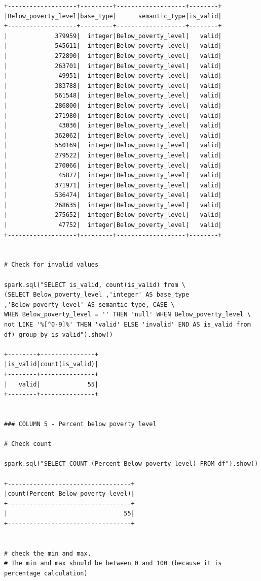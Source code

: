 \documentclass{article}
\begin{document}
\begin{verbatim}
+-------------------+---------+-------------------+--------+
|Below_poverty_level|base_type|      semantic_type|is_valid|
+-------------------+---------+-------------------+--------+
|             379959|  integer|Below_poverty_level|   valid|
|             545611|  integer|Below_poverty_level|   valid|
|             272890|  integer|Below_poverty_level|   valid|
|             263701|  integer|Below_poverty_level|   valid|
|              49951|  integer|Below_poverty_level|   valid|
|             383788|  integer|Below_poverty_level|   valid|
|             561548|  integer|Below_poverty_level|   valid|
|             286800|  integer|Below_poverty_level|   valid|
|             271980|  integer|Below_poverty_level|   valid|
|              43036|  integer|Below_poverty_level|   valid|
|             362062|  integer|Below_poverty_level|   valid|
|             550169|  integer|Below_poverty_level|   valid|
|             279522|  integer|Below_poverty_level|   valid|
|             270066|  integer|Below_poverty_level|   valid|
|              45877|  integer|Below_poverty_level|   valid|
|             371971|  integer|Below_poverty_level|   valid|
|             536474|  integer|Below_poverty_level|   valid|
|             268635|  integer|Below_poverty_level|   valid|
|             275652|  integer|Below_poverty_level|   valid|
|              47752|  integer|Below_poverty_level|   valid|
+-------------------+---------+-------------------+--------+


# Check for invalid values

spark.sql("SELECT is_valid, count(is_valid) from \  
(SELECT Below_poverty_level ,'integer' AS base_type ,'Below_poverty_level' AS semantic_type, CASE \  
WHEN Below_poverty_level = '' THEN 'null' WHEN Below_poverty_level \  
not LIKE '%[^0-9]%' THEN 'valid' ELSE 'invalid' END AS is_valid from df) group by is_valid").show()

+--------+---------------+
|is_valid|count(is_valid)|
+--------+---------------+
|   valid|             55|
+--------+---------------+


### COLUMN 5 - Percent below poverty level

# Check count

spark.sql("SELECT COUNT (Percent_Below_poverty_level) FROM df").show()

+----------------------------------+
|count(Percent_Below_poverty_level)|
+----------------------------------+
|                                55|
+----------------------------------+


# check the min and max. 
# The min and max should be between 0 and 100 (because it is percentage calculation)



\end{verbatim}
\end{document}
